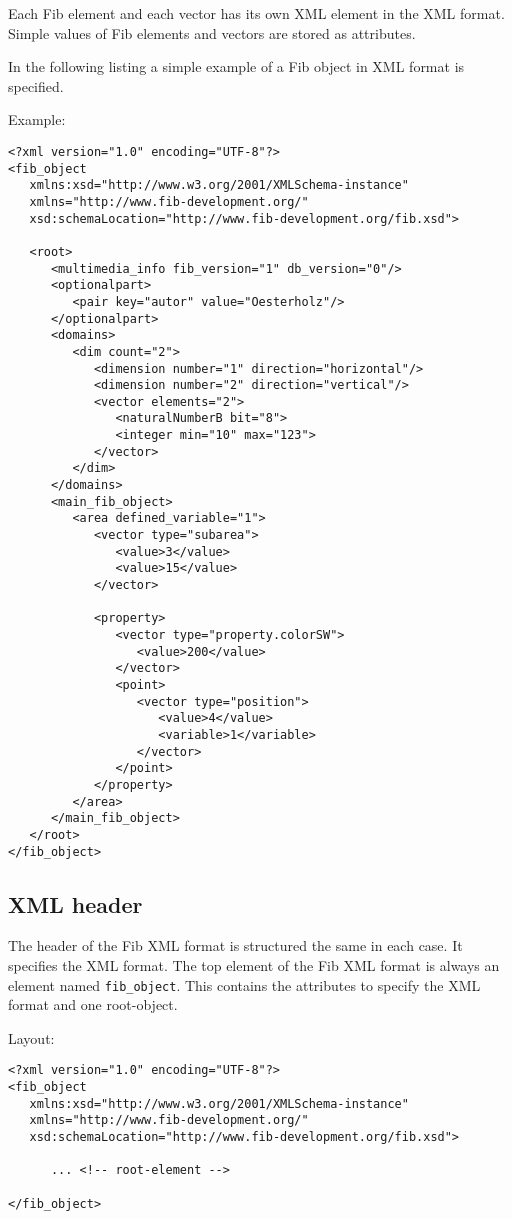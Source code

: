 Each Fib element and each vector has its own XML element in the XML format. Simple values of Fib elements and vectors are stored as attributes.

In the following listing a simple example of a Fib object in XML format is specified.

\bigskip\noindent
Example:
\begin{verbatim}
<?xml version="1.0" encoding="UTF-8"?>
<fib_object
   xmlns:xsd="http://www.w3.org/2001/XMLSchema-instance"
   xmlns="http://www.fib-development.org/"
   xsd:schemaLocation="http://www.fib-development.org/fib.xsd">

   <root>
      <multimedia_info fib_version="1" db_version="0"/>
      <optionalpart>
         <pair key="autor" value="Oesterholz"/>
      </optionalpart>
      <domains>
         <dim count="2">
            <dimension number="1" direction="horizontal"/>
            <dimension number="2" direction="vertical"/>
            <vector elements="2">
               <naturalNumberB bit="8">
               <integer min="10" max="123">
            </vector>
         </dim>
      </domains>
      <main_fib_object>
         <area defined_variable="1">
            <vector type="subarea">
               <value>3</value>
               <value>15</value>
            </vector>

            <property>
               <vector type="property.colorSW">
                  <value>200</value>
               </vector>
               <point>
                  <vector type="position">
                     <value>4</value>
                     <variable>1</variable>
                  </vector>
               </point>
            </property>
         </area>
      </main_fib_object>
   </root>
</fib_object>
\end{verbatim}


\subsection{XML header}

The header of the Fib XML format is structured the same in each case. It specifies the XML format. The top element of the Fib XML format is always an element named \verb|fib_object|. This contains the attributes to specify the XML format and one root-object.

\bigskip\noindent
Layout:
\begin{verbatim}
<?xml version="1.0" encoding="UTF-8"?>
<fib_object
   xmlns:xsd="http://www.w3.org/2001/XMLSchema-instance"
   xmlns="http://www.fib-development.org/"
   xsd:schemaLocation="http://www.fib-development.org/fib.xsd">

      ... <!-- root-element -->

</fib_object>
\end{verbatim}


